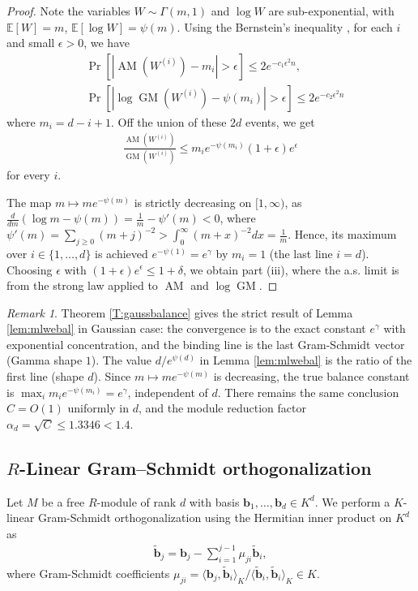 \documentclass[11pt,a4paper]{article}
\theoremstyle{plain}
\theoremstyle{definition}
\theoremstyle{remark}
\newtheorem{remark}[theorem]{Remark}
\newcommand{\E}{\mathbb{E}}
\begin{document}
\begin{proof}
Note the variables $W\sim\Gamma(m,1)$ and $\log W$ are sub-exponential, with $\E[W]=m$, $\E[\log W]=\psi(m)$. Using the Bernstein's inequality \cite{Billingsley95}, for each $i$ and small $\epsilon>0$, we have 
\begin{align}
&\Pr[|\operatorname{AM}(W^{(i)})-m_i|>\epsilon]\le2e^{-c_1\epsilon^2 n},
\\
&\Pr[|\log\operatorname{GM}(W^{(i)})-\psi(m_i)|>\epsilon]\le2e^{-c_2\epsilon^2 n}    
\end{align}
where $m_i=d-i+1$. Off the union of these $2d$ events, we get 
\begin{align}
 \frac{\operatorname{AM}(W^{(i)})}{\operatorname{GM}(W^{(i)})}
\le m_i e^{-\psi(m_i)}(1+\epsilon)e^{\epsilon}   
\end{align}
for every $i$. 

The map $m\mapsto m e^{-\psi(m)}$ is strictly decreasing on $[1,\infty)$, as $\tfrac{d}{dm}(\log m-\psi(m))=\tfrac{1}{m}-\psi'(m)<0$, where $\psi'(m)=\sum_{j\ge0}(m+j)^{-2}>\int_0^\infty(m+x)^{-2}dx=\tfrac{1}{m}$. Hence, its maximum over $i\in\{1, \dots, d\}$ is achieved $e^{-\psi(1)}=e^{\gamma}$ by $m_i=1$ (the last line $i=d$). Choosing $\epsilon$ with $(1+\epsilon)e^{\epsilon}\le 1+\delta$, we obtain part (iii), where the a.s. limit is from the strong law applied to $\operatorname{AM}$ and $\log\operatorname{GM}$.
\end{proof}

\begin{remark}
Theorem \ref{T:gaussbalance} gives the strict result of Lemma \ref{lem:mlwebal} in Gaussian case: the convergence is to the exact constant $e^\gamma$ with exponential concentration, and the binding line is the last Gram-Schmidt vector (Gamma shape $1$). The value $d/e^{\psi(d)}$ in Lemma \ref{lem:mlwebal} is the ratio of the first line (shape $d$). Since $m\mapsto m e^{-\psi(m)}$ is decreasing, the true balance constant is $\max_i m_i e^{-\psi(m_i)}=e^{\gamma}$, independent of $d$. There remains the same conclusion $C=O(1)$ uniformly in $d$, and the module reduction factor $\alpha_d=\sqrt{C}\leq 1.3346<1.4$.
\end{remark}

\subsection{$R$-Linear Gram–Schmidt orthogonalization}\label{subsec:rgs}

Let $M$ be a free $R$-module of rank $d$ with basis $\mathbf{b}_1, \dots, \mathbf{b}_d \in K^d$. We perform a $K$-linear Gram-Schmidt orthogonalization using the Hermitian inner product on $K^d$ as 
\begin{align}
  \tilde{\mathbf{b}}_j=\mathbf{b}_j-\sum_{i=1}^{j-1} \mu_{ji} \tilde{\mathbf{b}}_i,
  \label{E:GSKO}
\end{align}
where Gram-Schmidt coefficients $\mu_{ji}=\langle \mathbf{b}_j, \tilde{\mathbf{b}}_i \rangle_K/\langle \tilde{\mathbf{b}}_i, \tilde{\mathbf{b}}_i \rangle_K \in K$.
\end{document}
